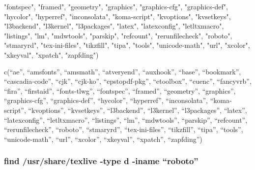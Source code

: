 \documentclass[
]{article}
\newenvironment{Shaded}{\begin{snugshade}}{\end{snugshade}}
\newcommand{\NormalTok}[1]{#1}
\newcommand{\StringTok}[1]{\textcolor[rgb]{0.31,0.60,0.02}{#1}}
\begin{document}
\begin{Shaded}
\begin{Highlighting}[]
\StringTok{"fontspec"}\NormalTok{, }\StringTok{"framed"}\NormalTok{, }\StringTok{"geometry"}\NormalTok{, }\StringTok{"graphics"}\NormalTok{, }\StringTok{"graphics{-}cfg"}\NormalTok{, }
\StringTok{"graphics{-}def"}\NormalTok{, }\StringTok{"hycolor"}\NormalTok{, }\StringTok{"hyperref"}\NormalTok{, }\StringTok{"inconsolata"}\NormalTok{, }\StringTok{"koma{-}script"}\NormalTok{, }
\StringTok{"kvoptions"}\NormalTok{, }\StringTok{"kvsetkeys"}\NormalTok{, }\StringTok{"l3backend"}\NormalTok{, }\StringTok{"l3kernel"}\NormalTok{, }\StringTok{"l3packages"}\NormalTok{, }
\StringTok{"latex"}\NormalTok{, }\StringTok{"latexconfig"}\NormalTok{, }\StringTok{"letltxmacro"}\NormalTok{, }\StringTok{"listings"}\NormalTok{, }\StringTok{"lm"}\NormalTok{, }\StringTok{"mdwtools"}\NormalTok{, }
\StringTok{"parskip"}\NormalTok{, }\StringTok{"refcount"}\NormalTok{, }\StringTok{"rerunfilecheck"}\NormalTok{, }\StringTok{"roboto"}\NormalTok{, }\StringTok{"stmaryrd"}\NormalTok{, }
\StringTok{"tex{-}ini{-}files"}\NormalTok{, }\StringTok{"tikzfill"}\NormalTok{, }\StringTok{"tipa"}\NormalTok{, }\StringTok{"tools"}\NormalTok{, }\StringTok{"unicode{-}math"}\NormalTok{, }
\StringTok{"url"}\NormalTok{, }\StringTok{"xcolor"}\NormalTok{, }\StringTok{"xkeyval"}\NormalTok{, }\StringTok{"xpatch"}\NormalTok{, }\StringTok{"zapfding"}\NormalTok{)}
\end{Highlighting}
\end{Shaded}

c(``ae'', ``amsfonts'', ``amsmath'', ``atveryend'', ``auxhook'',
``base'', ``bookmark'', ``cascadia-code'', ``cjk'', ``cjk-ko'',
``epstopdf-pkg'', ``etoolbox'', ``euenc'', ``fancyvrb'', ``fira'',
``firstaid'', ``fonts-tlwg'', ``fontspec'', ``framed'', ``geometry'',
``graphics'', ``graphics-cfg'', ``graphics-def'', ``hycolor'',
``hyperref'', ``inconsolata'', ``koma-script'', ``kvoptions'',
``kvsetkeys'', ``l3backend'', ``l3kernel'', ``l3packages'', ``latex'',
``latexconfig'', ``letltxmacro'', ``listings'', ``lm'', ``mdwtools'',
``parskip'', ``refcount'', ``rerunfilecheck'', ``roboto'', ``stmaryrd'',
``tex-ini-files'', ``tikzfill'', ``tipa'', ``tools'', ``unicode-math'',
``url'', ``xcolor'', ``xkeyval'', ``xpatch'', ``zapfding'')

\hypertarget{find-usrsharetexlive--type-d--iname-roboto}{%
\subsubsection{find /usr/share/texlive -type d -iname
``roboto''}\label{find-usrsharetexlive--type-d--iname-roboto}}
\end{document}
